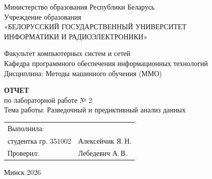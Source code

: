 \documentclass[14pt,a4paper]{extarticle}
\begin{document}
\begin{titlepage}
    \begin{center}
        Министерство образования Республики Беларусь\\[0.15cm]
        Учреждение образования\\[0.15cm]
        «БЕЛОРУССКИЙ ГОСУДАРСТВЕННЫЙ УНИВЕРСИТЕТ\\
        ИНФОРМАТИКИ И РАДИОЭЛЕКТРОНИКИ»
    \end{center}
    
    \vspace{0.4cm}
    
    \begin{flushleft}
        Факультет компьютерных систем и сетей\\[0.1cm]
        Кафедра программного обеспечения информационных технологий\\[0.1cm]
        Дисциплина: Методы машинного обучения (ММО)
    \end{flushleft}
    
    \vspace{2.2cm}
    
    \begin{center}
        \large\textbf{ОТЧЕТ}\\[0.2cm]
        \normalsize
        {по лабораторной работе № 2}\\[0.3cm]
        Тема работы: Разведочный и предиктивный анализ данных
    \end{center}
    
    \vspace{2.5cm}
    
    \noindent
    \begin{tabular}{@{}p{}@{}p{}@{}}
        Выполнила: & \\
        студентка гр. 351002 & Алексейчик Я.\,Н. \\[0.5cm]
        Проверил: & Лебедевич А.\,В.
    \end{tabular}
    
    \vfill
    
    \begin{center}
        Минск 2026
    \end{center}
\end{titlepage}
\end{document}
